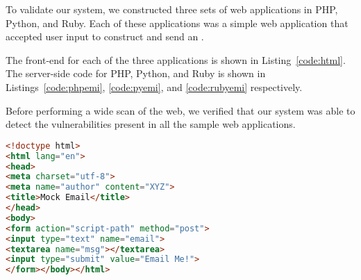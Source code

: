 To validate our system, we constructed three sets of web applications in PHP, Python, and Ruby. Each of these applications was a simple web application that accepted user input to construct and send an \Email.

The front-end for each of the three applications is shown in Listing~\ref{code:html}. The server-side code for PHP, Python, and Ruby is shown in Listings~\ref{code:phpemi}, \ref{code:pyemi}, and \ref{code:rubyemi} respectively.


Before performing a wide scan of the web, we verified that our system was able to detect the \ehi vulnerabilities present in all the sample web applications. 



\begin{lstlisting}[language=HTML,caption={HTML page for showcasing
      \ehi, a simple front-end for our
      examples.},label={code:html}, float]
<!doctype html>
<html lang="en">
<head>
<meta charset="utf-8">
<meta name="author" content="XYZ">
<title>Mock Email</title>
</head>
<body>
<form action="script-path" method="post">
<input type="text" name="email">
<textarea name="msg"></textarea>
<input type="submit" value="Email Me!">
</form></body></html>
\end{lstlisting}


